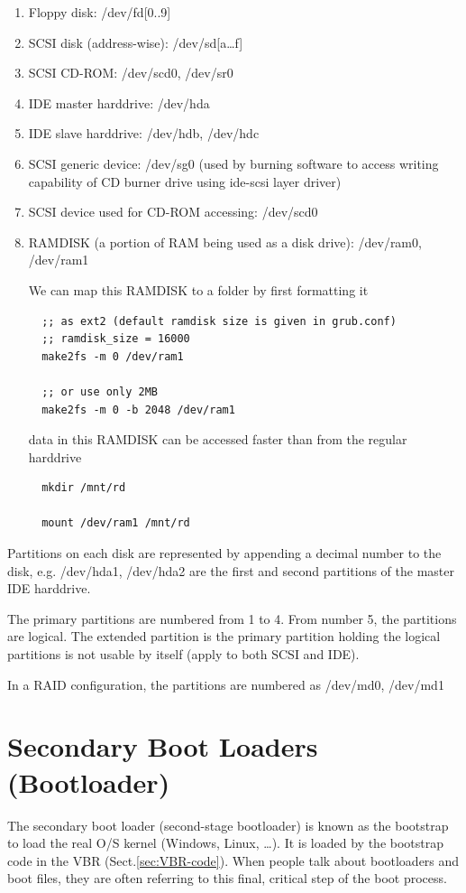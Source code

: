 \begin{enumerate}
  \item Floppy disk: /dev/fd[0..9] 
  \item SCSI disk (address-wise): /dev/sd[a\ldots f]
  \item SCSI CD-ROM: /dev/scd0, /dev/sr0
  \item IDE master harddrive: /dev/hda
  \item IDE slave harddrive: /dev/hdb, /dev/hdc
  \item SCSI generic device: /dev/sg0 (used by burning software to access
  writing capability of CD burner drive using ide-scsi layer driver)
  \item SCSI device used for CD-ROM accessing: /dev/scd0
  \item RAMDISK (a portion of RAM being used as a disk drive): /dev/ram0,
  /dev/ram1
  
  We can map this RAMDISK to a folder by first formatting it
  \begin{verbatim}
  ;; as ext2 (default ramdisk size is given in grub.conf)
  ;; ramdisk_size = 16000
  make2fs -m 0 /dev/ram1
  
  ;; or use only 2MB
  make2fs -m 0 -b 2048 /dev/ram1
  \end{verbatim}
  data in this RAMDISK can be accessed faster than from the regular harddrive
  \begin{verbatim}
  mkdir /mnt/rd
  
  mount /dev/ram1 /mnt/rd
  \end{verbatim}
\end{enumerate} 
Partitions on each disk are represented by appending a decimal number to the
disk, e.g. /dev/hda1, /dev/hda2 are the first and second partitions of the
master IDE harddrive. 

The primary partitions are numbered from 1 to 4. From number 5, the partitions
are logical. The extended partition is the primary partition holding the logical
partitions is not usable by itself (apply to both SCSI and IDE). 


In a RAID configuration, the partitions are numbered as /dev/md0, /dev/md1

\section{Secondary Boot Loaders (Bootloader)}
\label{sec:bootloader}
\label{sec:secondary-bootloader}

The secondary boot loader (second-stage bootloader) is known as the bootstrap to
load the real O/S kernel (Windows, Linux, \ldots). It is loaded by the bootstrap
code in the VBR (Sect.\ref{sec:VBR-code}). When people talk about bootloaders
and boot files, they are often referring to this final, critical step of the
boot process.

